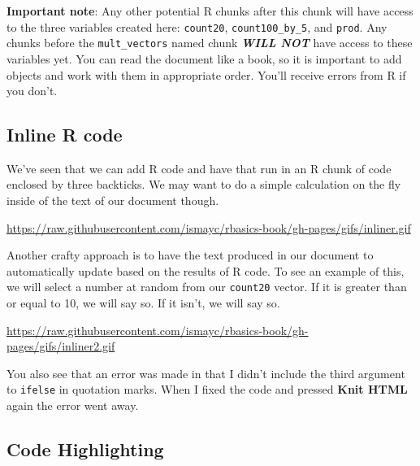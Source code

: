 \documentclass[]{tufte-book}
\begin{document}
\textbf{Important note}: Any other potential R chunks after this chunk
will have access to the three variables created here: \texttt{count20},
\texttt{count100\_by\_5}, and \texttt{prod}. Any chunks before the
\texttt{mult\_vectors} named chunk \textbf{\emph{WILL NOT}} have access
to these variables yet. You can read the document like a book, so it is
important to add objects and work with them in appropriate order. You'll
receive errors from R if you don't.

\subsection{Inline R code}\label{inline-r-code}

We've seen that we can add R code and have that run in an R chunk of
code enclosed by three backticks. We may want to do a simple calculation
on the fly inside of the text of our document though.

\vspace{0.1in}

\begin{center}\footnotesize{\url{https://raw.githubusercontent.com/ismayc/rbasics-book/gh-pages/gifs/inliner.gif}}\end{center}

\vspace{0.1in}

Another crafty approach is to have the text produced in our document to
automatically update based on the results of R code. To see an example
of this, we will select a number at random from our \texttt{count20}
vector. If it is greater than or equal to 10, we will say so. If it
isn't, we will say so.

\vspace{0.1in}

\begin{center}\footnotesize{\url{https://raw.githubusercontent.com/ismayc/rbasics-book/gh-pages/gifs/inliner2.gif}}\end{center}

\vspace{0.1in}

You also see that an error was made in that I didn't include the third
argument to \texttt{ifelse} in quotation marks. When I fixed the code
and pressed \textbf{Knit HTML} again the error went away.

\subsection{Code Highlighting}\label{code-highlighting}
\end{document}
